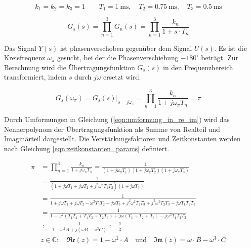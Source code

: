 \begin{equation}
    k_1=k_2=k_3=1
    \qquad
    T_1=\SI{1}{\milli\second}, \quad T_2=\SI{0.75}{\milli\second}, \quad T_3=\SI{0.5}{\milli\second}
    \label{eqn:zeitkonstanten_params}
\end{equation}

\begin{equation}
    G_s(s)= \prod_{n=1}^{3} G_n(s) = \prod_{n=1}^{3} \frac{k_n}{1+s\cdot T_n}
    \label{eqn:gesamt_uebertragungsfunktion}
\end{equation}

Das Signal $Y(s)$ ist phasenverschoben gegenüber dem Signal $U(s)$.
Es ist die Kreisfrequenz $\omega_{\pi}$ gesucht, bei der die Phasenverschiebung $-180^\circ$ beträgt.
Zur Berechnung wird die Übertragungsfunktion $G_s(s)$ in den Frequenzbereich transformiert, indem $s$ durch $j\omega$ ersetzt wird.

\begin{equation}
    G_s(\omega_{\pi})
    =
    G_s(s)\big|_{s=j\omega_{\pi}}
    =
    \prod_{n=1}^{3} \frac{k_n}{1+ j \omega_{\pi} T_n}
    =
    \pi
\end{equation}

Durch Umformungen in Gleichung (\ref{eqn:umformung_in_re_im}) wird das Nennerpolynom der Übertragungsfunktion als Summe von Realteil und Imaginärteil dargestellt. Die Verstärkungsfaktoren und Zeitkonstanten werden nach Gleichung \ref{eqn:zeitkonstanten_params} definiert.

\begin{equation}
    \begin{split}
        \pi &= \prod_{n=1}^{3} \frac{k_n}{1+ j \omega_{\pi} T_n} = \frac{1}{(1+j \omega_{\pi} T_1)(1+j \omega_{\pi} T_2)(1+j \omega_{\pi} T_3)} \\
        & = \frac{1}{(1+j\omega T_1 + j \omega T_2 + j^2 \omega^2 T_1 T_2)(1+j\omega T_3)} \\
        & = \frac{1}{1+j\omega T_1 + j \omega T_2 - \omega^2T_1 T_2 + j \omega T_3 + j^2 \omega^2 T_1 T_3 + j^2 \omega^2 T_2 T_3 - j \omega T_1 T_2 T_3} \\
        & = \frac{1}{1- \omega^2(T_1 T_2 + T_1 T_3 + T_2 T_3)+ j \omega (T_1 + T_2 + T_3)-j\omega^3 T_1 T_2 T_3  } \\
        & := \frac{1}{1-\omega^2  A + j  (\omega  B - \omega^3  C)} := \frac{1}{z} \\[1ex]       
        & z \in \mathbb{C}: \quad \mathfrak{Re}(z) = 1-\omega^2 \cdot A \quad \text{und} \quad \mathfrak{Im}(z)=\omega \cdot B - \omega^3 \cdot C
    \end{split}
    \label{eqn:umformung_in_re_im}
\end{equation}

